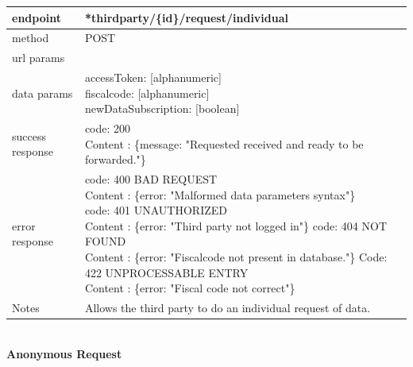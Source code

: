 \begin{legal}
\begin{legal}
\begin{itemize}
							\begin{tabularx}{\linewidth}{| l| l }
								\hline
								endpoint & *thirdparty/\{id\}/request/individual \\
								\hline
								method & POST \\
								\hline
								url params & \\
								\hline
								data params &
								\parbox{0.7\textwidth}{
									\bigskip
									accessToken: [alphanumeric]\\
									fiscalcode: [alphanumeric]\\
									newDataSubscription: [boolean]
									\bigskip
								} \\
								\hline
								success response &
								\parbox{0.7\textwidth}{
									\bigskip
									code: 200\\
									Content : \{message: "Requested received and ready to be forwarded."\}
									\bigskip
								} \\
								\hline
								error response &
								\parbox{0.7\textwidth}{
									\bigskip
									code: 400 BAD REQUEST \\
									Content : \{error: "Malformed data parameters syntax"\}\\
									code: 401 UNAUTHORIZED \\
									Content : \{error: "Third party not logged in"\}
									code: 404 NOT FOUND \\
									Content : \{error: "Fiscalcode not present in database."\}
									Code: 422 UNPROCESSABLE ENTRY \\
									Content : \{error: "Fiscal code not correct"\}
									\bigskip
								} \\
								\hline
								Notes & 
								\parbox{0.7\textwidth}{
									\bigskip Allows the third party to do an individual request of data.
								\bigskip}  \\
								\hline
							\end{tabularx}\\
							\newpage
							\textbf{Anonymous Request} \\
			

\end{itemize}
\end{legal}
\end{legal}
